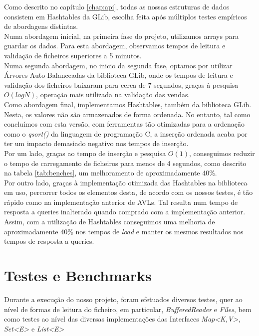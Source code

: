 \documentclass[a4paper]{report}
\begin{document}
Como descrito no capítulo \ref{chap:api}, todas as nossas estruturas de dados consistem 
em Hashtables da GLib, escolha feita após múltiplos testes empíricos de abordagens distintas.\\
Numa abordagem inicial, na primeira fase do projeto, utilizamos arrays para 
guardar os dados. Para esta abordagem, observamos tempos de leitura e validação de ficheiros
superiores a 5 minutos.\\
Numa segunda abordagem, no inicio da segunda fase, optamos por utilizar 
Árvores Auto-Balanceadas da biblioteca GLib, onde os tempos de leitura e validação 
dos ficheiros baixaram para cerca de 7 segundos, graças à pesquisa $O(log N)$,
operação mais utilizada na validação das vendas.\\
Como abordagem final, implementamos Hashtables, também da biblioteca GLib.
Nesta, os valores não são armazenados de forma ordenada. No entanto,
tal como concluímos com esta versão, com ferramentas tão otimizadas para a ordenação
como o \textit{qsort()} da linguagem de programação C, a inserção ordenada acaba por ter
um impacto demasiado negativo nos tempos de inserção.\\
Por um lado, graças ao tempo de inserção e pesquisa $O(1)$, conseguimos reduzir
o tempo de carregamento de ficheiros para menos de 4 segundos, como descrito
na tabela \ref{tab:benches}, um melhoramento de aproximadamente 40\%.\\
Por outro lado, graças à implementação otimizada das Hashtables na biblioteca em uso,
percorrer todos os elementos desta, de acordo com os nossos testes, é tão rápido como
na implementação anterior de AVLs. Tal resulta num tempo de resposta a queries
inalterado quando comprado com a implementação anterior.\\
Assim, com a utilização de Hashtables conseguimos uma melhoria de
aproximadamente 40\% nos tempos de \textit{load} e manter os mesmos resultados nos
tempos de resposta a queries.

\chapter{Testes e Benchmarks}

Durante a execução do nosso projeto, foram efetuados diversos testes, quer ao nível
de formas de leitura do ficheiro, em particular, \textit{BufferedReader} e \textit{Files},
bem como testes ao nível das diversas implementações das Interfaces \textit{Map<K,V>},
\textit{Set<E>} e \textit{List<E>}
\end{document}
